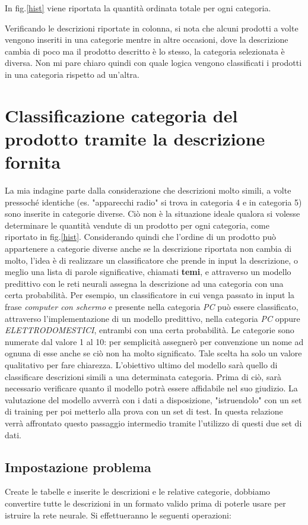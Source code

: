 \documentclass[10pt,a4paper]{report}
\begin{document}
In fig.\ref{hist} viene riportata la quantità ordinata totale per ogni categoria.

Verificando le descrizioni riportate in colonna, si nota che alcuni prodotti a volte vengono inseriti in una categorie mentre in altre occasioni, dove la descrizione cambia di poco ma il prodotto descritto è lo stesso, la categoria selezionata è diversa.
Non mi pare chiaro quindi con quale logica vengono classificati i prodotti in una categoria rispetto ad un'altra.

\section*{Classificazione categoria del prodotto tramite la descrizione fornita}
La mia indagine parte dalla considerazione che descrizioni molto simili, a volte pressoché identiche (es. "apparecchi radio" si trova in categoria 4 e in categoria 5) sono inserite in categorie diverse. Ciò non è la situazione ideale qualora si volesse determinare le quantità vendute di un prodotto per ogni categoria, come riportato in fig.\ref{hist}. 
Considerando quindi che l'ordine di un prodotto può appartenere a categorie diverse anche se la descrizione riportata non cambia di molto, l'idea è di realizzare un classificatore che prende in input la descrizione, o meglio una lista di parole significative, chiamati \textbf{temi}, e attraverso un modello predittivo con le reti neurali assegna la descrizione ad una categoria con una certa probabilità. 
Per esempio, un classificatore in cui venga passato in input la frase \textit{computer con schermo} e presente nella categoria \textit{PC} può essere classificato, attraverso l'implementazione di un modello predittivo, nella categoria \textit{PC} oppure \textit{ELETTRODOMESTICI}, entrambi con una certa probabilità. 
Le categorie sono numerate dal valore 1 al 10: per semplicità assegnerò per convenzione un nome ad ognuna di esse anche se ciò non ha molto significato. Tale scelta ha solo un valore qualitativo per fare chiarezza. L'obiettivo ultimo del modello sarà quello di classificare descrizioni simili a una determinata categoria. Prima di ciò, sarà necessario verificare quanto il modello potrà essere affidabile nel suo giudizio. La valutazione del modello avverrà con i dati a disposizione, "istruendolo" con un set di training per poi metterlo alla prova con un set di test. 
In questa relazione verrà affrontato questo passaggio intermedio tramite l'utilizzo di questi due set di dati.

\subsection*{Impostazione problema}
Create le tabelle e inserite le descrizioni e le relative categorie, dobbiamo convertire tutte le descrizioni in un formato valido prima di poterle usare per istruire la rete neurale. Si effettueranno le seguenti operazioni:
\end{document}
